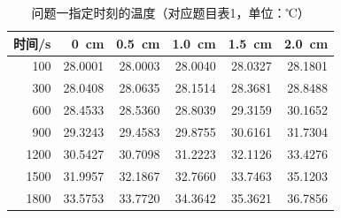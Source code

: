 \begin{table}[htbp]
\centering\small
\caption{问题一指定时刻的温度（对应题目表1，单位：℃）}\label{tab:paper1}
\begin{tabular}{rrrrrr}
\toprule
时间/s & 0~cm & 0.5~cm & 1.0~cm & 1.5~cm & 2.0~cm \\
\midrule
100 & 28.0001 & 28.0003 & 28.0040 & 28.0327 & 28.1801 \\
300 & 28.0408 & 28.0635 & 28.1514 & 28.3681 & 28.8488 \\
600 & 28.4533 & 28.5360 & 28.8039 & 29.3159 & 30.1652 \\
900 & 29.3243 & 29.4583 & 29.8755 & 30.6161 & 31.7304 \\
1200 & 30.5427 & 30.7098 & 31.2223 & 32.1126 & 33.4276 \\
1500 & 31.9957 & 32.1867 & 32.7660 & 33.7463 & 35.1203 \\
1800 & 33.5753 & 33.7720 & 34.3642 & 35.3621 & 36.7856 \\
\bottomrule
\end{tabular}
\end{table}
